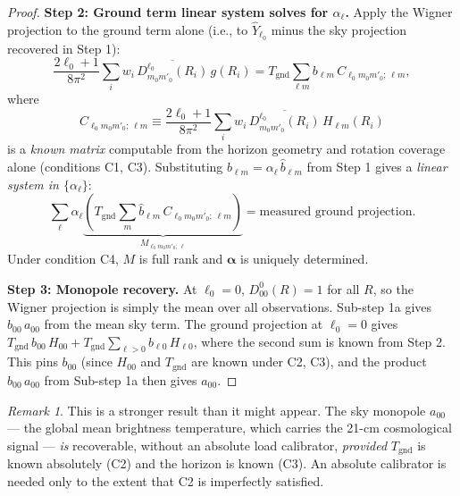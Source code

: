 \documentclass{aastex631}
\newcommand{\Hlm}{H_{\ell m}}
\newcommand{\Tgnd}{T_\mathrm{gnd}}
\theoremstyle{plain}
\theoremstyle{remark}
\newtheorem{remark}{Remark}
\begin{document}
\begin{proof}
\textbf{Step 2: Ground term linear system solves for $\alpha_\ell$.}
Apply the Wigner projection to the ground term alone (i.e., to
$\hat{Y}_{\ell_0}$ minus the sky projection recovered in Step 1):
\begin{equation}
  \frac{2\ell_0+1}{8\pi^2}
  \sum_i w_i\, \overline{D^{\ell_0}_{m_0 m'_0}(R_i)}\, g(R_i)
  = \Tgnd \sum_{\ell m} b_{\ell m}\, C_{\ell_0 m_0 m'_0;\,\ell m},
\end{equation}
where
\begin{equation} \label{eq:Cmat}
  C_{\ell_0 m_0 m'_0;\,\ell m}
  \equiv \frac{2\ell_0+1}{8\pi^2}
  \sum_i w_i\,
  \overline{D^{\ell_0}_{m_0 m'_0}(R_i)}\,\Hlm(R_i)
\end{equation}
is a \emph{known matrix} computable from the horizon geometry and
rotation coverage alone (conditions C1, C3).
Substituting $b_{\ell m} = \alpha_\ell\,\hat{b}_{\ell m}$ from Step 1
gives a \emph{linear system in $\{\alpha_\ell\}$}:
\begin{equation} \label{eq:alphasystem}
  \sum_\ell \alpha_\ell \underbrace{\left(
    \Tgnd \sum_m \hat{b}_{\ell m}\,
    C_{\ell_0 m_0 m'_0;\,\ell m}
  \right)}_{M_{\ell_0 m_0 m'_0;\,\ell}}
  = \text{measured ground projection}.
\end{equation}
Under condition C4, $M$ is full rank and $\boldsymbol{\alpha}$ is
uniquely determined.

\textbf{Step 3: Monopole recovery.}
At $\ell_0 = 0$, $D^0_{00}(R) = 1$ for all $R$, so the Wigner
projection is simply the mean over all observations.
Sub-step 1a gives $b_{00}\,a_{00}$ from the mean sky term.
The ground projection at $\ell_0 = 0$ gives
$\Tgnd\,b_{00}\,H_{00} + \Tgnd\sum_{\ell>0} b_{\ell 0}\,H_{\ell 0}$,
where the second sum is known from Step 2.
This pins $b_{00}$ (since $H_{00}$ and $\Tgnd$ are known under C2,
C3), and the product $b_{00}\,a_{00}$ from Sub-step 1a then gives
$a_{00}$.
\end{proof}

\begin{remark}
This is a stronger result than it might appear.
The sky monopole $a_{00}$ --- the global mean brightness temperature,
which carries the 21-cm cosmological signal --- \emph{is} recoverable,
without an absolute load calibrator, \emph{provided} $\Tgnd$
is known absolutely (C2) and the horizon is known (C3).
An absolute calibrator is needed only to the extent that C2 is
imperfectly satisfied.
\end{remark}

\end{document}
